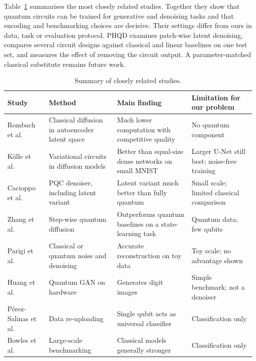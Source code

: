 Table~\ref{tab:related} summarises the most closely related studies. Together they show that quantum circuits can be trained for generative and denoising tasks and that encoding and benchmarking choices are decisive. Their settings differ from ours in data, task or evaluation protocol. PHQD examines patch-wise latent denoising, compares several circuit designs against classical and linear baselines on one test set, and measures the effect of removing the circuit output. A parameter-matched classical substitute remains future work.

\begin{table}[t]
\caption{Summary of closely related studies.}\label{tab:related}
\centering\scriptsize
\renewcommand{\arraystretch}{1.25}
\begin{tabular}{@{}>{\raggedright\arraybackslash}p{}>{\raggedright\arraybackslash}p{}>{\raggedright\arraybackslash}p{}>{\raggedright\arraybackslash}p{}@{}}
\toprule
Study & Method & Main finding & Limitation for our problem\\
\midrule
Rombach et al.~\cite{rombach} & Classical diffusion in autoencoder latent space & Much lower computation with competitive quality & No quantum component\\
K\"olle et al.~\cite{kolle} & Variational circuits in diffusion models & Better than equal-size dense networks on small MNIST & Larger U-Net still best; noise-free training\\
Cacioppo et al.~\cite{cacioppo} & PQC denoiser, including latent variant & Latent variant much better than fully quantum & Small scale; limited classical comparison\\
Zhang et al.~\cite{zhang} & Step-wise quantum diffusion & Outperforms quantum baselines on a state-learning task & Quantum data; few qubits\\
Parigi et al.~\cite{parigi} & Classical or quantum noise and denoising & Accurate reconstruction on toy data & Toy scale; no advantage shown\\
Huang et al.~\cite{huang} & Quantum GAN on hardware & Generates digit images & Simple benchmark; not a denoiser\\
P\'erez-Salinas et al.~\cite{salinas} & Data re-uploading & Single qubit acts as universal classifier & Classification only\\
Bowles et al.~\cite{bowles} & Large-scale benchmarking & Classical models generally stronger & Classification only\\
\bottomrule
\end{tabular}
\end{table}
